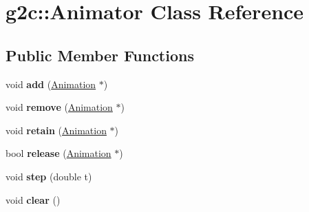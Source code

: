 \hypertarget{classg2c_1_1_animator}{
\section{g2c::Animator Class Reference}
\label{classg2c_1_1_animator}
}
\subsection*{Public Member Functions}
\begin{DoxyCompactItemize}
\item 
\hypertarget{classg2c_1_1_animator_ac51dc93cea31b2c20dcbfe7f6b0c896a}{
void {\bfseries add} (\hyperlink{classg2c_1_1_animation}{Animation} $\ast$)}
\label{classg2c_1_1_animator_ac51dc93cea31b2c20dcbfe7f6b0c896a}

\item 
\hypertarget{classg2c_1_1_animator_a471e7934efcc14c8fb0f8872a1390022}{
void {\bfseries remove} (\hyperlink{classg2c_1_1_animation}{Animation} $\ast$)}
\label{classg2c_1_1_animator_a471e7934efcc14c8fb0f8872a1390022}

\item 
\hypertarget{classg2c_1_1_animator_ac1b0e8adb7de9b8888824fc9ec182122}{
void {\bfseries retain} (\hyperlink{classg2c_1_1_animation}{Animation} $\ast$)}
\label{classg2c_1_1_animator_ac1b0e8adb7de9b8888824fc9ec182122}

\item 
\hypertarget{classg2c_1_1_animator_a9dd697653bcbd75597a35d613a5d7c05}{
bool {\bfseries release} (\hyperlink{classg2c_1_1_animation}{Animation} $\ast$)}
\label{classg2c_1_1_animator_a9dd697653bcbd75597a35d613a5d7c05}

\item 
\hypertarget{classg2c_1_1_animator_a9330fcd4fa0218eb37893af6899454e0}{
void {\bfseries step} (double t)}
\label{classg2c_1_1_animator_a9330fcd4fa0218eb37893af6899454e0}

\item 
\hypertarget{classg2c_1_1_animator_abae4565d93b82555c1f628cc4dc4df91}{
void {\bfseries clear} ()}
\label{classg2c_1_1_animator_abae4565d93b82555c1f628cc4dc4df91}

\end{DoxyCompactItemize}
